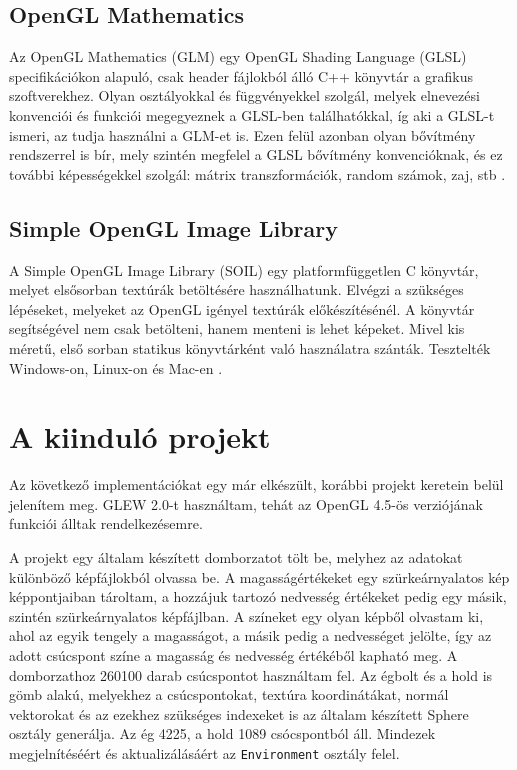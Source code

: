 \subsection{OpenGL Mathematics}

Az OpenGL Mathematics (GLM) egy OpenGL Shading Language (GLSL) specifikációkon alapuló, csak header fájlokból álló C++ könyvtár a grafikus szoftverekhez. Olyan osztályokkal és függvényekkel szolgál, melyek elnevezési konvenciói és funkciói megegyeznek a GLSL-ben találhatókkal, íg aki a GLSL-t ismeri, az tudja használni a GLM-et is. Ezen felül azonban olyan bővítmény rendszerrel is bír, mely szintén megfelel a GLSL bővítmény konvencióknak, és ez további képességekkel szolgál: mátrix transzformációk, random számok, zaj, stb \cite{glm}.

\subsection{Simple OpenGL Image Library}

A Simple OpenGL Image Library (SOIL) egy platformfüggetlen C könyvtár, melyet elsősorban textúrák betöltésére használhatunk. Elvégzi a szükséges lépéseket, melyeket az OpenGL igényel textúrák előkészítésénél. A könyvtár segítségével nem csak betölteni, hanem menteni is lehet képeket. Mivel kis méretű, első sorban statikus könyvtárként való használatra szánták. Tesztelték Windows-on, Linux-on és Mac-en \cite{soil}.

\section{A kiinduló projekt}

Az következő implementációkat egy már elkészült, korábbi projekt keretein belül jelenítem meg. GLEW 2.0-t használtam, tehát az OpenGL 4.5-ös verziójának funkciói álltak rendelkezésemre. 

A projekt egy általam készített domborzatot tölt be, melyhez az adatokat különböző képfájlokból olvassa be. A magasságértékeket egy szürkeárnyalatos kép képpontjaiban tároltam, a hozzájuk tartozó nedvesség értékeket pedig egy másik, szintén szürkeárnyalatos képfájlban. A színeket egy olyan képből olvastam ki, ahol az egyik tengely a magasságot, a másik pedig a nedvességet jelölte, így az adott csúcspont színe a magasság és nedvesség értékéből kapható meg. A domborzathoz 260100 darab csúcspontot használtam fel. Az égbolt és a hold is gömb alakú, melyekhez a csúcspontokat, textúra koordinátákat, normál vektorokat és az ezekhez szükséges indexeket is az általam készített Sphere osztály generálja. Az ég 4225, a hold 1089 csócspontból áll. Mindezek megjelnítéséért és aktualizálásáért az \texttt{Environment} osztály felel.

